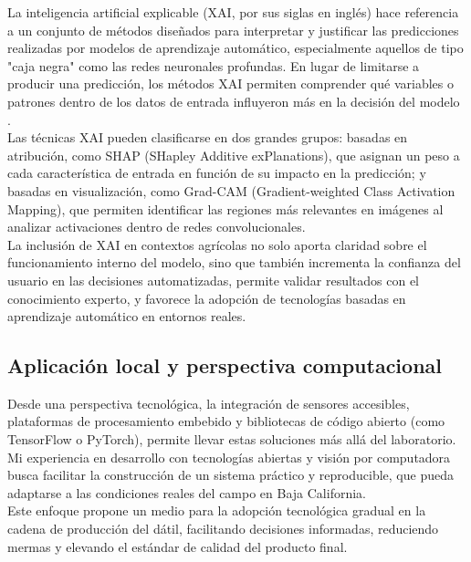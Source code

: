 La inteligencia artificial explicable (XAI, por sus siglas en inglés) hace referencia a un conjunto de métodos diseñados para interpretar y justificar las predicciones realizadas por modelos de aprendizaje automático, especialmente aquellos de tipo "caja negra" como las redes neuronales profundas. En lugar de limitarse a producir una predicción, los métodos XAI permiten comprender qué variables o patrones dentro de los datos de entrada influyeron más en la decisión del modelo \parencite{lundberg_unified_2017}.\\

Las técnicas XAI pueden clasificarse en dos grandes grupos: basadas en atribución, como SHAP (SHapley Additive exPlanations), que asignan un peso a cada característica de entrada en función de su impacto en la predicción; y basadas en visualización, como Grad-CAM (Gradient-weighted Class Activation Mapping), que permiten identificar las regiones más relevantes en imágenes al analizar activaciones dentro de redes convolucionales.\\

La inclusión de XAI en contextos agrícolas no solo aporta claridad sobre el funcionamiento interno del modelo, sino que también incrementa la confianza del usuario en las decisiones automatizadas, permite validar resultados con el conocimiento experto, y favorece la adopción de tecnologías basadas en aprendizaje automático en entornos reales.

\subsection{Aplicación local y perspectiva computacional}

Desde una perspectiva tecnológica, la integración de sensores accesibles, plataformas de procesamiento embebido y bibliotecas de código abierto (como TensorFlow o PyTorch), permite llevar estas soluciones más allá del laboratorio. Mi experiencia en desarrollo con tecnologías abiertas y visión por computadora busca facilitar la construcción de un sistema práctico y reproducible, que pueda adaptarse a las condiciones reales del campo en Baja California.\\

Este enfoque propone un medio para la adopción tecnológica gradual en la cadena de producción del dátil, facilitando decisiones informadas, reduciendo mermas y elevando el estándar de calidad del producto final.


